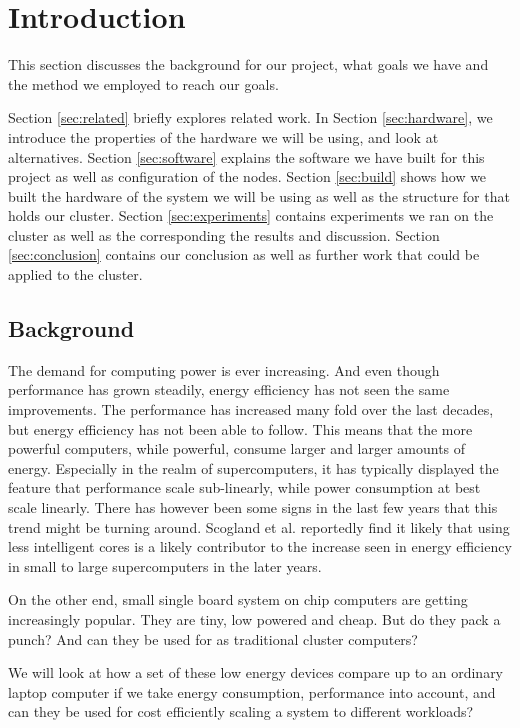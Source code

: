 \clearpage
\section{Introduction}
\label{sec:introduction}

This section discusses the background for our project, what goals we have and the method we employed to reach our goals.

Section \ref{sec:related} briefly explores related work. 
In Section \ref{sec:hardware}, we introduce the properties of the hardware we will be using, and look at alternatives.
Section \ref{sec:software} explains the software we have built for this project as well as configuration of the nodes.
Section \ref{sec:build} shows how we built the hardware of the system we will be using as well as the structure for that holds our cluster.
Section \ref{sec:experiments} contains experiments we ran on the cluster as well as the corresponding the results and discussion.
Section \ref{sec:conclusion} contains our conclusion as well as further work that could be applied to the cluster.

\subsection{Background}
The demand for computing power is ever increasing. And even though performance has grown steadily, energy efficiency has not seen the same improvements. 
The performance has increased many fold over the last decades, but energy efficiency has not been able to follow. This means that the more powerful computers, while powerful, consume larger and larger amounts of energy. Especially in the realm of supercomputers, it has typically displayed the feature that performance scale sub-linearly, while power consumption at best scale linearly.
There has however been some signs in the last few years that this trend might be turning around\cite{green500}. 
Scogland et al.\cite{green500} reportedly find it likely that using less intelligent cores is a likely contributor to the increase seen in energy efficiency in small to large supercomputers in the later years.

On the other end, small single board system on chip computers are getting increasingly popular. They are tiny, low powered and cheap. But do they pack a punch? And can they be used for as traditional cluster computers?

We will look at how a set of these low energy devices compare up to an ordinary laptop computer if we take energy consumption, performance into account, and can they be used for cost efficiently scaling a system to different workloads?

